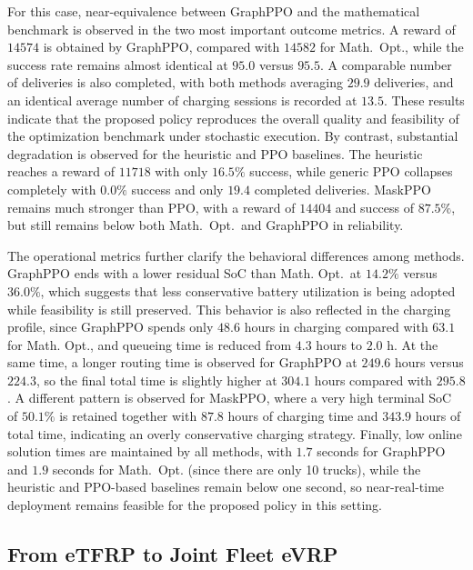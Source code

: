 \documentclass[a4paper,fleqn]{cas-sc}
\begin{document}
For this case, near-equivalence between GraphPPO and the mathematical benchmark is observed in the two most important outcome metrics. A reward of $14574$ is obtained by GraphPPO, compared with $14582$ for Math.\ Opt., while the success rate remains almost identical at $95.0$ versus $95.5$. A comparable number of deliveries is also completed, with both methods averaging $29.9$ deliveries, and an identical average number of charging sessions is recorded at $13.5$. These results indicate that the proposed policy reproduces the overall quality and feasibility of the optimization benchmark under stochastic execution. By contrast, substantial degradation is observed for the heuristic and PPO baselines. The heuristic reaches a reward of $11718$ with only $16.5\%$ success, while generic PPO collapses completely with $0.0\%$ success and only $19.4$ completed deliveries. MaskPPO remains much stronger than PPO, with a reward of $14404$ and success of $87.5\%$, but still remains below both Math.\ Opt.\ and GraphPPO in reliability.

The operational metrics further clarify the behavioral differences among methods. GraphPPO ends with a lower residual SoC than Math. Opt.\ at $14.2\%$ versus $36.0\%$, which suggests that less conservative battery utilization is being adopted while feasibility is still preserved. This behavior is also reflected in the charging profile, since GraphPPO spends only $48.6$ hours in charging compared with $63.1$ for Math. Opt., and queueing time is reduced from $4.3$ hours to $2.0$ h. At the same time, a longer routing time is observed for GraphPPO at $249.6$ hours versus $224.3$, so the final total time is slightly higher at $304.1$ hours compared with $295.8$. A different pattern is observed for MaskPPO, where a very high terminal SoC of $50.1\%$ is retained together with $87.8$ hours of charging time and $343.9$ hours of total time, indicating an overly conservative charging strategy. Finally, low online solution times are maintained by all methods, with $1.7$ seconds for GraphPPO and $1.9$ seconds for Math.\ Opt. (since there are only 10 trucks), while the heuristic and PPO-based baselines remain below one second, so near-real-time deployment remains feasible for the proposed policy in this setting.

\subsection{From eTFRP to Joint Fleet eVRP}\label{sec:joint_evrp}
\end{document}
